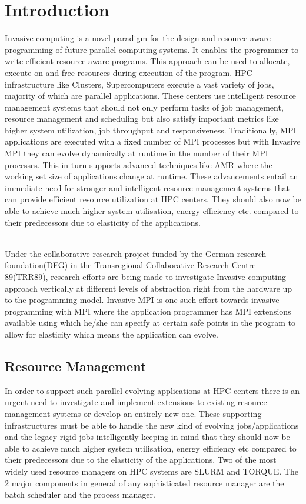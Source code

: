 \documentclass{article}
\begin{document}
\section{Introduction}
Invasive computing is a novel paradigm for the design and resource-aware programming of future parallel computing systems. It enables the programmer to write efficient resource aware programs. This approach can be used to allocate, execute on and free resources during execution of the program. HPC infrastructure like Clusters, Supercomputers execute a vast variety of jobs, majority of which are parallel applications. These centers use intelligent resource management systems that should not only perform tasks of job management, resource management and scheduling but also satisfy important metrics like higher system utilization, job throughput and responsiveness. Traditionally, MPI applications are executed with a fixed number of MPI processes but with Invasive MPI they can evolve dynamically at runtime in the number of their MPI processes. This in turn supports advanced techniques like AMR where the working set size of applications change at runtime. These advancements entail an immediate need for stronger and intelligent resource management systems that can provide efficient resource utilization at HPC centers. They should also now be able to achieve much higher system utilisation, energy efficiency etc. compared to their predecessors due to elasticity of the applications.\par 
\noindent
\\Under the collaborative research project funded by the German research foundation(DFG) in the Transregional Collaborative Research Centre 89(TRR89), research efforts are being made to investigate Invasive computing approach vertically at different levels of abstraction right from the hardware up to the programming model. Invasive MPI is one such effort towards invasive programming with MPI where the application programmer has MPI extensions available using which he/she can specify at certain safe points in the program to allow for elasticity which means the application can evolve.
 
\subsection{Resource Management}
In order to support such parallel evolving applications at HPC centers there is an urgent need to investigate and implement extensions to existing resource management systems or develop an entirely new one. These supporting infrastructures must be able to handle the new kind of evolving jobs/applications and the legacy rigid jobs intelligently keeping in mind that they should now be able to achieve much higher system utilisation, energy efficiency etc compared to their predecessors due to the elasticity of the applications. Two of the most widely used resource managers on HPC systems are SLURM and TORQUE. The 2 major components in general of any sophisticated resource manager are the batch scheduler and the process manager.
\end{document}
